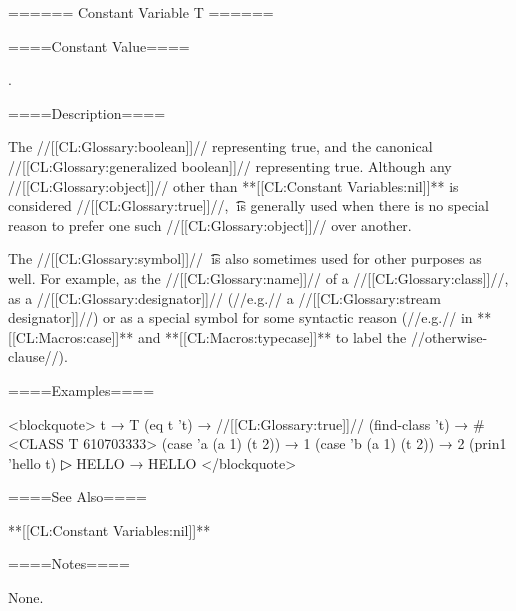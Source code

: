 ====== Constant Variable T ======

====Constant Value====

.

====Description====

The //[[CL:Glossary:boolean]]// representing true, and the canonical //[[CL:Glossary:generalized boolean]]// representing true. Although any //[[CL:Glossary:object]]// other than **[[CL:Constant Variables:nil]]** is considered //[[CL:Glossary:true]]//, \t\ is generally used when there is no special reason to prefer one such //[[CL:Glossary:object]]// over another.

The //[[CL:Glossary:symbol]]// \t\ is also sometimes used for other purposes as well. For example, as the //[[CL:Glossary:name]]// of a //[[CL:Glossary:class]]//, as a //[[CL:Glossary:designator]]// (//e.g.// a //[[CL:Glossary:stream designator]]//) or as a special symbol for some syntactic reason (//e.g.// in **[[CL:Macros:case]]** and **[[CL:Macros:typecase]]** to label the //otherwise-clause//).

====Examples====

<blockquote> t → T (eq t 't) → //[[CL:Glossary:true]]// (find-class 't) → #<CLASS T 610703333> (case 'a (a 1) (t 2)) → 1 (case 'b (a 1) (t 2)) → 2 (prin1 'hello t)
▷ HELLO → HELLO </blockquote>

====See Also====

**[[CL:Constant Variables:nil]]**

====Notes====

None.

